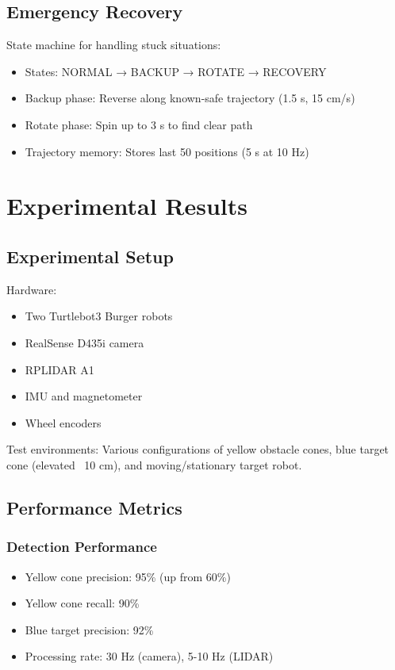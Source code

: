\documentclass[11pt,a4paper]{article}
\begin{document}
\subsection{Emergency Recovery}

State machine for handling stuck situations:
\begin{itemize}
    \item States: NORMAL → BACKUP → ROTATE → RECOVERY
    \item Backup phase: Reverse along known-safe trajectory (1.5 s, 15 cm/s)
    \item Rotate phase: Spin up to 3 s to find clear path
    \item Trajectory memory: Stores last 50 positions (5 s at 10 Hz)
\end{itemize}

\section{Experimental Results}

\subsection{Experimental Setup}

Hardware:
\begin{itemize}
    \item Two Turtlebot3 Burger robots
    \item RealSense D435i camera
    \item RPLIDAR A1
    \item IMU and magnetometer
    \item Wheel encoders
\end{itemize}

Test environments: Various configurations of yellow obstacle cones, blue target cone (elevated ~10 cm), and moving/stationary target robot.

\subsection{Performance Metrics}

\subsubsection{Detection Performance}
\begin{itemize}
    \item Yellow cone precision: 95\% (up from 60\%)
    \item Yellow cone recall: 90\%
    \item Blue target precision: 92\%
    \item Processing rate: 30 Hz (camera), 5-10 Hz (LIDAR)
\end{itemize}
\end{document}
